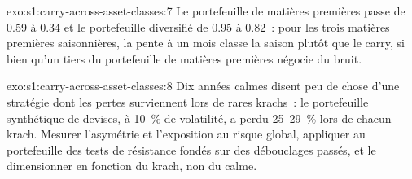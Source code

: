 \begin{solution}{exo:s1:carry-across-asset-classes:7}
Le portefeuille de matières premières passe de 0.59 à 0.34 et le portefeuille diversifié de 0.95 à 0.82~: pour les trois matières premières saisonnières, la pente à un mois classe la
saison plutôt que le carry, si bien qu'un tiers du portefeuille de matières premières négocie du bruit.
\end{solution}

\begin{solution}{exo:s1:carry-across-asset-classes:8}
Dix années calmes disent peu de chose d'une stratégie dont les pertes surviennent lors de rares krachs~: le portefeuille synthétique de devises, à 10~\% de volatilité, a perdu 25--29~\% lors de chacun
krach. Mesurer l'asymétrie et l'exposition au risque global, appliquer au portefeuille des tests de résistance fondés sur des débouclages passés, et le dimensionner en fonction du krach, non du calme.
\end{solution}

